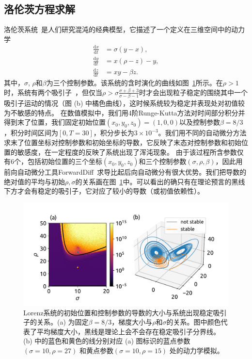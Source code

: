 \documentclass[A4,twoside,UTF8]{ctexart}
\def\D{\mathrm{d}}
\begin{document}
\subsection{洛伦茨方程求解}
洛伦茨系统~\cite{Lorenz1963}是人们研究混沌的经典模型，它描述了一个定义在三维空间中的动力学
\begin{align*}
    \frac{\D x}{\D t} &= \sigma(y - x),\\
    \frac{\D y}{\D t} &= x(\rho -z) - y,\\
    \frac{\D z}{\D t} &= xy-\beta z.
\end{align*}
其中，$\sigma$, $\rho$和$\beta$为三个控制参数。该系统的含时演化的曲线如图~\ref{fig:chaos}所示。在$\rho>1$时，系统有两个吸引子~\cite{Hirsch2012}，但仅当$\rho > \sigma \frac{\sigma + \beta + 3}{\sigma - \beta - 1}$时才会出现粒子稳定的围绕其中一个吸引子运动的情况（图 (b) 中橘色曲线），这时候系统较为稳定并表现处对初值较为不敏感的特点。
在数值模拟中，我们用4阶Runge-Kutta方法对时间部分积分并得到末了位置，我们固定初始位置$(x_0,y_0,z_0) = (1, 0, 0)$以及控制参数$\beta=8/3$，积分时间区间为$[0,T=30]$，积分步长为$3\times 10^{-3}$。我们用不同的自动微分方法求末了位置坐标对控制参数和初始坐标的导数，它反映了末态对控制参数和初始位置的敏感度，在一定程度的反映了系统出现了浑沌现象。
由于该过程所含参数仅有6个，包括初始位置的三个坐标$(x_0, y_0, z_0)$和三个控制参数$(\sigma, \rho,\beta)$，因此用前向自动微分工具ForwardDiff~\cite{Revels2016}求导比起后向自动微分有很大优势。我们把导数的绝对值的平均与初始$\rho,\sigma$的关系画在图~\ref{fig:chaos}中。可以看出的确只有在理论预言的黑线下方才会有稳定的吸引子，它对应了较小的导数（或初值依赖性）。
\begin{figure}[t]
\centering
\includegraphics[width=0.8\columnwidth]{./fig4.pdf}
    \caption{Lorenz系统的初始位置和控制参数的导数的大小与系统出现稳定吸引子的关系。(a) 为固定$\beta=8/3$，梯度大小与$\rho$和$\sigma$的关系。图中颜色代表了平均梯度大小，黑线是理论上会不会存在稳定吸引子分界线。(b) 中的蓝色和黄色的线分别对应 (a) 图标识的蓝点参数 $(\sigma=10, \rho=27)$ 和黄点参数$(\sigma=10, \rho=15)$ 处的动力学模拟。\label{fig:chaos}}
\end{figure}
\end{document}
